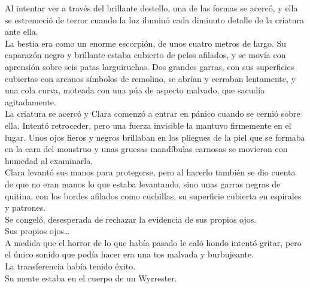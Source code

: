 Al intentar ver a través del brillante destello, una de las formas se
acercó, y ella se estremeció de terror cuando la luz iluminó cada
diminuto detalle de la criatura ante ella.\\
La bestia era como un enorme escorpión, de unos cuatro metros de largo.
Su caparazón negro y brillante estaba cubierto de pelos afilados, y se
movía con aprensión sobre seis patas larguiruchas. Dos grandes garras,
con sus superficies cubiertas con arcanos símbolos de remolino, se
abrían y cerraban lentamente, y una cola curva, moteada con una púa de
aspecto malvado, que sacudía agitadamente.\\
La criatura se acercó y Clara comenzó a entrar en pánico cuando se
cernió sobre ella. Intentó retroceder, pero una fuerza invisible la
mantuvo firmemente en el lugar. Unos ojos fieros y negros brillaban en
los pliegues de la piel que se formaba en la cara del monstruo y unas
gruesas mandíbulas carnosas se movieron con humedad al examinarla.\\
Clara levantó sus manos para protegerse, pero al hacerlo también se dio
cuenta de que no eran manos lo que estaba levantando, sino unas garras
negras de quitina, con los bordes afilados como cuchillas, su superficie
cubierta en espirales y patrones.\\
Se congeló, desesperada de rechazar la evidencia de sus propios ojos.\\
Sus propios ojos\ldots{}\\
A medida que el horror de lo que había pasado le caló hondo intentó
gritar, pero el único sonido que podía hacer era una tos malvada y
burbujeante.\\
La transferencia había tenido éxito.\\
Su mente estaba en el cuerpo de un Wyrrester.\\
